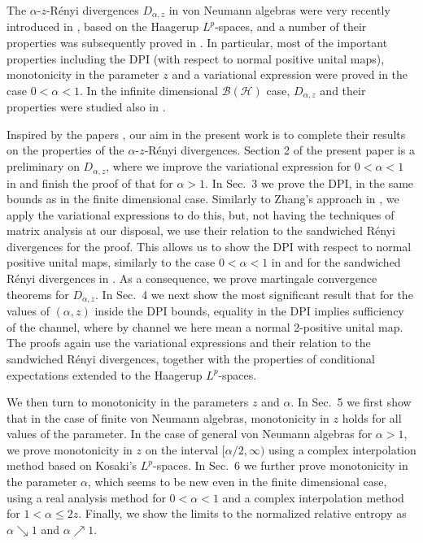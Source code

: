 \documentclass[12pt]{article}
\theoremstyle{definition}
\theoremstyle{remark}
\numberwithin{equation}{section}
\begin{document}
The $\alpha$-$z$-R\'enyi divergences $D_{\alpha,z}$ in von Neumann algebras were very recently
introduced in \cite{kato2023aremark}, {based on the Haagerup $L^p$-spaces}, and a number of
their properties was subsequently proved in \cite{kato2023onrenyi}. In particular, most of the important
properties including the DPI (with respect to normal positive unital maps), monotonicity in the parameter $z$
and a variational expression were proved in the case $0<\alpha<1$. In the infinite dimensional
$\mathcal{B}(\mathcal{H})$ case, $D_{\alpha,z}$ and their properties were studied also in
\cite{mosonyi2023thestrong}.


Inspired by the papers \cite{kato2023aremark, kato2023onrenyi}, our aim in the present
work is to complete their results on the properties of the $\alpha$-$z$-R\'enyi divergences.
Section 2 of the present paper is a preliminary on $D_{\alpha,z}$, {\color{red}where we improve the
variational expression for $0<\alpha<1$ in \cite{kato2023onrenyi} and finish the proof of that for $\alpha>1$.}
In Sec.~3 we prove the DPI, in the same bounds as in the finite dimensional case. Similarly to
Zhang's approach in \cite{zhang2020fromwyd}, we apply the variational expressions to {do} this,
but, not having the techniques of matrix analysis at our disposal,
we use their relation to the sandwiched R\'enyi divergences for the proof. This allows us
to show the DPI with respect to normal positive unital maps, similarly to the case $0<\alpha<1$
in \cite{kato2023onrenyi} and for the sandwiched R\'enyi divergences in
\cite{jencova2018renyi,jencova2021renyi}. As a consequence, we prove martingale convergence
theorems for $D_{\alpha,z}$. In Sec.~4 we next show the most significant result that for the
values of $(\alpha,z)$ inside the DPI bounds, equality in the DPI implies sufficiency of the channel,
where by channel we here mean a normal 2-positive unital map. The proofs again use the variational
expressions and their relation to the sandwiched R\'enyi divergences, together with the properties of
conditional expectations extended to the Haagerup $L^p$-spaces.

We then turn to monotonicity in the parameters $z$ and $\alpha$. In Sec.~5 we first show that in the
case of finite von Neumann algebras,  monotonicity in $z$ holds for all values of the parameter. 
In the case of general von Neumann algebras for $\alpha>1$, we prove monotonicity in $z$
on the interval $[\alpha/2,\infty)$ using a complex interpolation method
based on Kosaki's $L^p$-spaces. In Sec.~6 we further prove monotonicity in the parameter
$\alpha$, which seems to be new even in the finite dimensional case, using a real analysis method
for $0<\alpha<1$ and a complex interpolation method for $1<\alpha\le2z$. Finally, we show the limits
to the normalized relative entropy as $\alpha\searrow 1$ and $\alpha\nearrow 1$.
\end{document}

